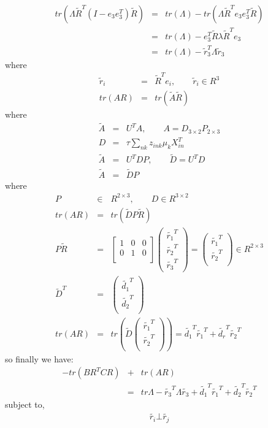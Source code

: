 \documentclass[11pt]{article}
\begin{document}
\begin{eqnarray*}
tr(\Lambda \tilde{R}^T(I-e_3e_3^T)\tilde{R}) &=& tr(\Lambda)-tr(\Lambda\tilde{R}^Te_3e_3^T\tilde{R}) \\
&=&tr(\Lambda)-e_3^T\tilde{R}\lambda\tilde{R}^Te_3 \\
&=&tr(\Lambda)-\tilde{r}_3^T\Lambda\tilde{r}_3 
\end{eqnarray*}
where
\begin{eqnarray*}
 \tilde{r}_i &=& \tilde{R}^Te_i, \qquad \tilde{r}_i\in R^3 \\
tr(AR) &=& tr(\tilde{A}\tilde{R}) 
\end{eqnarray*}
where
\begin{eqnarray*}
 \tilde{A} &=& U^TA, \qquad A=D_{3\times2}P_{2\times3} \\
D &=& \tau\sum_{nk}z_{ink}\mu_kX_{in}^T \\
\tilde{A} &=& U^TDP, \qquad \tilde{D}=U^TD\\
\tilde{A} &=& \tilde{D}P 
\end{eqnarray*}
where
\begin{eqnarray*}
 P &\in & R^{2\times3}, \qquad D\in R^{3\times2} \\
tr(AR) &=& tr(\tilde{D}P\tilde{R}) \\
P\tilde{R} &=& \begin{bmatrix}1 & 0&0 \\ 0 & 1&0 \\ \end{bmatrix}\left(\begin{array}{c}\tilde{r_1}^T\\ \tilde{r_2}^T \\ \tilde{r_3}^T\end{array}\right)=\left(\begin{array}{c}\tilde{r_1}^T\\ \tilde{r_2}^T \\ \end{array}\right) \in R^{2\times3} \\
\tilde{D}^T &=& \left(\begin{array}{c}\tilde{d_1}^T\\ \tilde{d_2}^T \\ \end{array}\right) \\
tr(AR) &=& tr(\tilde{D}\left(\begin{array}{c}\tilde{r_1}^T\\ \tilde{r_2}^T \\ \end{array}\right))=\tilde{d_1}^T\tilde{r_1}^T+\tilde{d_r}^T\tilde{r_2}^T 
\end{eqnarray*}
so finally we have:
\begin{eqnarray*}
-tr(BR^TCR) &+& tr(AR) \\
&=& tr\Lambda-\tilde{r_3}^T\Lambda\tilde{r_3}+\tilde{d_1}^T\tilde{r_1}^T+\tilde{d_2}^T\tilde{r_2}^T 
\end{eqnarray*}
subject to,
\begin{eqnarray*}
 \tilde{r_i}\bot\tilde{r_j}
\end{eqnarray*}
\end{document}
